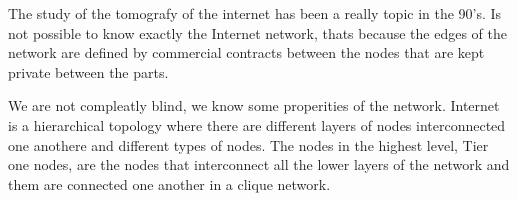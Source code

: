 
The study of the tomografy of the internet has been a really  topic in the
90's.
Is not possible to know exactly the Internet network, thats because the edges
of the network are defined by commercial contracts between the nodes that are 
kept private between the parts.

We are not compleatly blind, we know some properities of the network.
Internet is a hierarchical topology where there
are different layers of nodes interconnected one anothere and different types of
nodes.
The nodes in the highest level, Tier one nodes, are the nodes that interconnect
all the lower layers of the network and them are
connected one another in a clique network.

